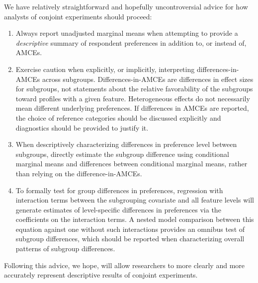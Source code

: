 \documentclass[a4paper,12pt]{article}\usepackage[]{graphicx}\usepackage[]{color}
\begin{document}
We have relatively straightforward and hopefully uncontroversial advice for how analysts of conjoint experiments should proceed:

\begin{enumerate}
\item Always report unadjusted marginal means when attempting to provide a \textit{descriptive} summary of respondent preferences in addition to, or instead of, AMCEs.%

\item Exercise caution when explicitly, or implicitly, interpreting differences-in-AMCEs across subgroups. Differences-in-AMCEs are differences in effect sizes for subgroups, not statements about the relative favorability of the subgroups toward profiles with a given feature. Heterogeneous effects do not necessarily mean different underlying preferences. If differences in AMCEs are reported, the choice of reference categories should be discussed explicitly and diagnostics should be provided to justify it.

\item When descriptively characterizing differences in preference level between subgroups, directly estimate the subgroup difference using conditional marginal means and differences between conditional marginal means, rather than relying on the difference-in-AMCEs.

\item To formally test for group differences in preferences, regression with interaction terms between the subgrouping covariate and all feature levels will generate estimates of level-specific differences in preferences via the coefficients on the interaction terms. A nested model comparison between this equation against one without such interactions provides an omnibus test of subgroup differences, which should be reported when characterizing overall patterns of subgroup differences.
\end{enumerate}

\noindent Following this advice, we hope, will allow researchers to more clearly and more accurately represent descriptive results of conjoint experiments.
\end{document}
